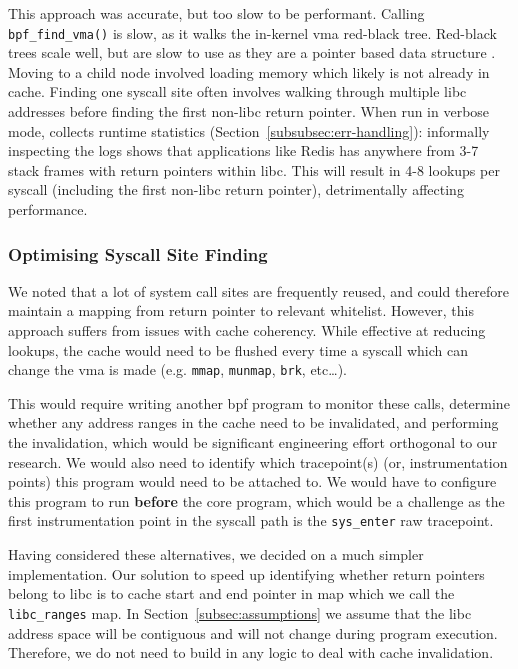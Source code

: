 This approach was accurate, but too slow to be performant. Calling \texttt{bpf\_find\_vma()} is
slow, as it walks the in-kernel \ac{vma} red-black tree. Red-black trees scale
well, but are slow to use as they are a pointer based data structure \cite{pointer-based-ds-slow}. Moving to
a child node involved loading memory which likely is not already in cache.
Finding one syscall site often involves walking through multiple \ac{libc}
addresses before finding the first non-\ac{libc} return pointer. When run in
verbose mode, \af collects runtime statistics
(Section~\ref{subsubsec:err-handling}): informally inspecting the logs shows that
applications like Redis has anywhere from 3-7 stack frames with return pointers 
within \ac{libc}. This will result in 4-8 lookups per syscall (including the
first non-\ac{libc} return pointer), detrimentally affecting performance.

\subsubsection{Optimising Syscall Site
Finding}\label{subsubsec:impl-find-site-opt}

We noted that a lot of system call sites are frequently reused, and could
therefore maintain a mapping from return pointer to relevant whitelist. However,
this approach suffers from issues with cache coherency. While effective at
reducing lookups, the cache would need to be flushed every time a syscall which
can change the \ac{vma} is made (e.g. \texttt{mmap}, \texttt{munmap},
\texttt{brk}, etc\dots). 

This would require writing another \ac{bpf} program to
monitor these calls, determine whether any address ranges in the cache need to
be invalidated, and performing the invalidation, which would be significant
engineering effort orthogonal to our research. We would also need to identify
which tracepoint(s) (or, instrumentation points) this program would need to be
attached to. We would have to configure this program to run \textbf{before} the
\af core program, which would be a challenge as the first instrumentation point
in the syscall path is the \texttt{sys\_enter} raw tracepoint.

Having considered these alternatives, we decided on a much simpler
implementation. Our solution to speed up identifying whether return pointers
belong to \ac{libc} is to cache  start and end pointer in 
map which we call the \texttt{libc\_ranges} map. In 
Section~\ref{subsec:assumptions} we assume that the  \ac{libc} address space 
will be contiguous and will not change during program execution. Therefore, we
do not need to build in any logic to deal with cache invalidation.

